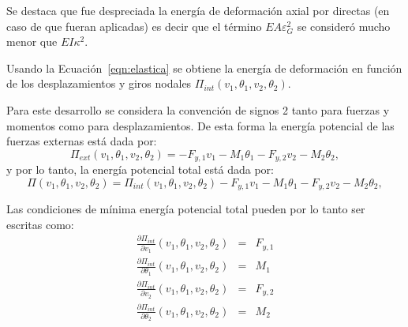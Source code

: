 %
Se destaca que fue despreciada la energía de deformación axial por directas (en caso de que fueran aplicadas) es decir que el término $EA\varepsilon_G^2$ se consideró mucho menor que $EI \kappa^2$.

Usando la Ecuación~\eqref{eqn:elastica} se obtiene la energía de deformación en función de los desplazamientos y giros nodales $\Pi_{int}(v_1,\theta_1,v_2,\theta_2)$.

Para este desarrollo se considera la convención de signos 2 tanto para fuerzas y momentos como para desplazamientos. %
%
De esta forma la energía potencial de las fuerzas externas está dada por:
\begin{equation}
\Pi_{ext}(v_1,\theta_1,v_2,\theta_2) = - F_{y,1} v_1 - M_1 \theta_1  - F_{y,2} v_2 - M_2 \theta_2,
\end{equation}
%
y por lo tanto, la energía potencial total está dada por:
\begin{equation}
\Pi(v_1,\theta_1,v_2,\theta_2) =  \Pi_{int}(v_1,\theta_1,v_2,\theta_2)  - F_{y,1} v_1 - M_1 \theta_1 - F_{y,2} v_2 - M_2 \theta_2,
\end{equation}

Las condiciones de mínima energía potencial total pueden por lo tanto ser escritas como:
%
\begin{eqnarray}
\frac{\partial \Pi_{int}}{\partial v_1}(v_1,\theta_1,v_2,\theta_2) &=&  F_{y,1} \\
\frac{\partial \Pi_{int}}{\partial \theta_1}(v_1,\theta_1,v_2,\theta_2) &=&  M_1 \label{eqn:ut3castm1} \\
\frac{\partial \Pi_{int}}{\partial v_2}(v_1,\theta_1,v_2,\theta_2) &=&  F_{y,2} \\
\frac{\partial \Pi_{int}}{\partial \theta_2}(v_1,\theta_1,v_2,\theta_2) &=&  M_2
\end{eqnarray}


